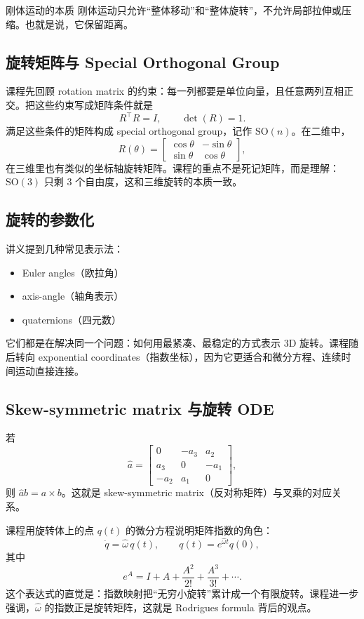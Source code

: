 \documentclass[a4paper]{article}
\begin{document}
\begin{importantbox}{刚体运动的本质}
刚体运动只允许“整体移动”和“整体旋转”，不允许局部拉伸或压缩。也就是说，它保留距离。
\end{importantbox}

\subsection{旋转矩阵与 Special Orthogonal Group}
课程先回顾 rotation matrix 的约束：每一列都要是单位向量，且任意两列互相正交。把这些约束写成矩阵条件就是
\[
R^\top R = I, \qquad \det(R)=1.
\]
满足这些条件的矩阵构成 special orthogonal group，记作 \(\mathrm{SO}(n)\)。在二维中，
\[
R(\theta)=
\begin{bmatrix}
\cos\theta & -\sin\theta\\
\sin\theta & \cos\theta
\end{bmatrix},
\]
在三维里也有类似的坐标轴旋转矩阵。课程的重点不是死记矩阵，而是理解：\(\mathrm{SO}(3)\) 只剩 3 个自由度，这和三维旋转的本质一致。

\subsection{旋转的参数化}
讲义提到几种常见表示法：
\begin{itemize}
    \item Euler angles（欧拉角）
    \item axis-angle（轴角表示）
    \item quaternions（四元数）
\end{itemize}
它们都是在解决同一个问题：如何用最紧凑、最稳定的方式表示 3D 旋转。课程随后转向 exponential coordinates（指数坐标），因为它更适合和微分方程、连续时间运动直接连接。

\subsection{Skew-symmetric matrix 与旋转 ODE}
若
\[
\hat{a}=
\begin{bmatrix}
0 & -a_3 & a_2\\
a_3 & 0 & -a_1\\
-a_2 & a_1 & 0
\end{bmatrix},
\]
则 \(\hat a b = a \times b\)。这就是 skew-symmetric matrix（反对称矩阵）与叉乘的对应关系。

课程用旋转体上的点 \(q(t)\) 的微分方程说明矩阵指数的角色：
\[
\dot q = \hat{\omega}\,q(t),
\qquad
q(t)=e^{\hat{\omega}t}q(0),
\]
其中
\[
e^A = I + A + \frac{A^2}{2!} + \frac{A^3}{3!} + \cdots.
\]
这个表达式的直觉是：指数映射把“无穷小旋转”累计成一个有限旋转。课程进一步强调，\(\hat\omega\) 的指数正是旋转矩阵，这就是 Rodrigues formula 背后的观点。
\end{document}
